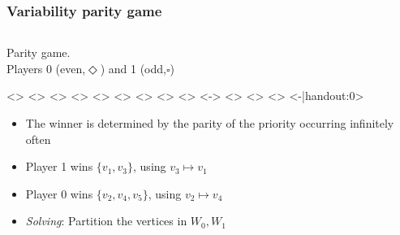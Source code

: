 \documentclass[aspectratio=169]{beamer}
\newcounter{picite}
\newcounter{piciteb}
\begin{document}
\begin{frame}[t]
\frametitle{Variability parity game}
\begin{columns}[t]
	\begin{column}{0.5\textwidth}
		\large Parity game.\small\\
		Players 0 (even,$\Diamond$) and 1 (odd,$\square$)\\
		\begin{center}
			\setcounter{picite}{0}%
			\def\showprio{0}
			\def\token{0}%
			\only<\thepicite>{}\pause%
			\def\token{1}%
			\only<\thepicite>{}\pause%
			\def\token{3}%
			\only<\thepicite>{}\pause%
			\def\token{4}%
			\only<\thepicite>{}\pause%
			\def\token{5}%
			\only<\thepicite>{}\pause%
			\def\token{2}%
			\only<\thepicite>{}\pause%
			\def\token{4}%
			\only<\thepicite>{}\pause%
			\def\token{5}%
			\only<\thepicite>{}\pause%
			\def\token{2}%
			\only<\thepicite>{}\pause%
			\def\showprio{1}%
			\def\token{-1}%
			\setcounter{piciteb}{\thepicite}%
			\only<\thepicite-\thepiciteb>{}%
			\def\token{1}%
			\only<\thepicite>{}%
			\def\token{3}%
			\only<\thepicite>{}%
			\def\token{1}%
			\only<\thepicite>{}%
			\def\token{-1}%
			\only<\thepicite-|handout:0>{}%
		\end{center}
		\begin{itemize}
			\item The winner is determined by the parity of the priority occurring infinitely often\pause
			\pause\pause\pause%
			\item Player 1 wins $\{v_1,v_3\}$, using $v_3 \mapsto v_1$\pause
			\item Player 0 wins $\{v_2,v_4,v_5\}$, using $v_2 \mapsto v_4$\pause{}
			\item \textit{Solving}: Partition the vertices in $W_0,W_1$\pause{}
		\end{itemize}
	\end{column}

\end{columns}
\end{frame}
\end{document}
